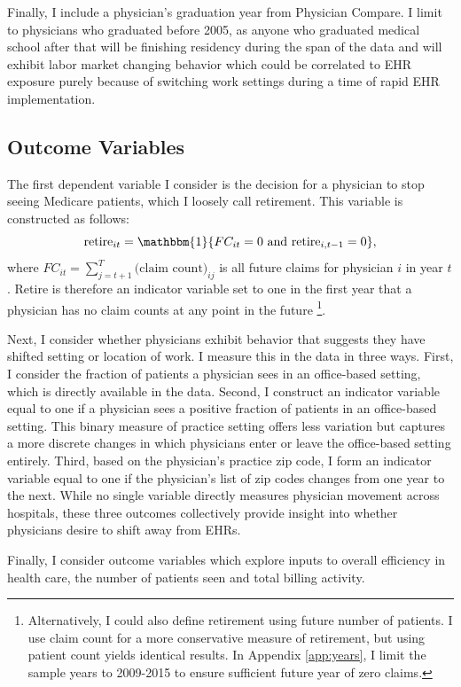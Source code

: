 \documentclass[11pt]{article}
\begin{document}
Finally, I include a physician's graduation year from Physician Compare. I limit to physicians who graduated before 2005, as anyone who graduated medical school after that will be finishing residency during the span of the data and will exhibit labor market changing behavior which could be correlated to EHR exposure purely because of switching work settings during a time of rapid EHR implementation.

\subsection{Outcome Variables}\label{sec:outcome}

The first dependent variable I consider is the decision for a physician to stop seeing Medicare patients, which I loosely call retirement. This variable is constructed as follows: 
$$\text{retire}_{it}=\mathbbm{1}\{FC_{it}=0 \text{ and retire}_{i,t-1}=0\}, $$
where $FC_{it}=\sum\limits_{j=t+1}^T\text{(claim count)}_{ij}$ is all future claims for physician $i$ in year $t$. Retire is therefore an indicator variable set to one in the first year that a physician has no claim counts at any point in the future \footnote{Alternatively, I could also define retirement using future number of patients. I use claim count for a more conservative measure of retirement, but using patient count yields identical results. In Appendix \ref{app:years}, I limit the sample years to 2009-2015 to ensure sufficient future year of zero claims.}.

Next, I consider whether physicians exhibit behavior that suggests they have shifted setting or location of work. I measure this in the data in three ways. First, I consider the fraction of patients a physician sees in an office-based setting, which is directly available in the data. Second, I construct an indicator variable equal to one if a physician sees a positive fraction of patients in an office-based setting. This binary measure of practice setting offers less variation but captures a more discrete changes in which physicians enter or leave the office-based setting entirely. Third, based on the physician's practice zip code, I form an indicator variable equal to one if the physician's list of zip codes changes from one year to the next. While no single variable directly measures physician movement across hospitals, these three outcomes collectively provide insight into whether physicians desire to shift away from EHRs.

Finally, I consider outcome variables which explore inputs to overall efficiency in health care, the number of patients seen and total billing activity.
\end{document}
